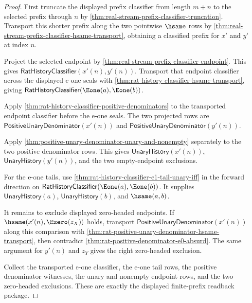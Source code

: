 \begin{proof}
First truncate the displayed prefix classifier from length $m+n$ to the selected
prefix through $n$ by
\autoref{thm:real-stream-prefix-classifier-truncation}. Transport this shorter
prefix along the two pointwise $\hsame$ rows by
\autoref{thm:real-stream-prefix-classifier-hsame-transport}, obtaining a
classified prefix for $x'$ and $y'$ at index $n$.

Project the selected endpoint by
\autoref{thm:real-stream-prefix-classifier-endpoint}. This gives
$\mathsf{RatHistoryClassifier}(x'(n),y'(n))$. Transport that endpoint classifier
across the displayed e-one seals with
\autoref{thm:rat-history-classifier-hsame-transport}, giving
$\mathsf{RatHistoryClassifier}(\Eone(a),\Eone(b))$.

Apply \autoref{thm:rat-history-classifier-positive-denominators} to the
transported endpoint classifier before the e-one seals. The two projected rows
are $\mathsf{PositiveUnaryDenominator}(x'(n))$ and
$\mathsf{PositiveUnaryDenominator}(y'(n))$.

Apply \autoref{thm:positive-unary-denominator-unary-and-nonempty} separately to
the two positive-denominator rows. This gives
$\mathsf{UnaryHistory}(x'(n))$, $\mathsf{UnaryHistory}(y'(n))$, and the two
empty-endpoint exclusions.

For the e-one tails, use
\autoref{thm:rat-history-classifier-e1-tail-unary-iff} in the forward direction
on $\mathsf{RatHistoryClassifier}(\Eone(a),\Eone(b))$. It supplies
$\mathsf{UnaryHistory}(a)$, $\mathsf{UnaryHistory}(b)$, and $\hsame(a,b)$.

It remains to exclude displayed zero-headed endpoints. If
$\hsame(x'(n),\Ezero(z_X))$ holds, transport
$\mathsf{PositiveUnaryDenominator}(x'(n))$ along this comparison with
\autoref{thm:rat-positive-unary-denominator-hsame-transport}, then contradict
\autoref{thm:rat-positive-denominator-e0-absurd}. The same argument for
$y'(n)$ and $z_Y$ gives the right zero-headed exclusion.

Collect the transported e-one classifier, the e-one tail rows, the positive
denominator witnesses, the unary and nonempty endpoint rows, and the two
zero-headed exclusions. These are exactly the displayed finite-prefix readback
package.
\end{proof}

